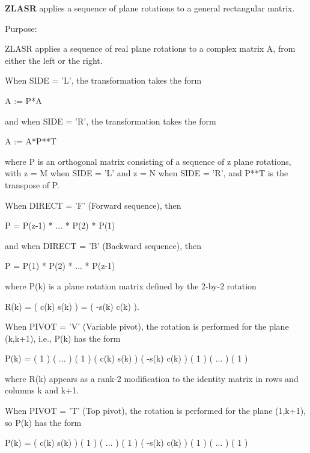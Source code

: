 {\bfseries Z\+L\+A\+S\+R} applies a sequence of plane rotations to a general rectangular matrix. 

 \begin{DoxyParagraph}{Purpose\+: }
\begin{DoxyVerb} ZLASR applies a sequence of real plane rotations to a complex matrix
 A, from either the left or the right.

 When SIDE = 'L', the transformation takes the form

    A := P*A

 and when SIDE = 'R', the transformation takes the form

    A := A*P**T

 where P is an orthogonal matrix consisting of a sequence of z plane
 rotations, with z = M when SIDE = 'L' and z = N when SIDE = 'R',
 and P**T is the transpose of P.
 
 When DIRECT = 'F' (Forward sequence), then
 
    P = P(z-1) * ... * P(2) * P(1)
 
 and when DIRECT = 'B' (Backward sequence), then
 
    P = P(1) * P(2) * ... * P(z-1)
 
 where P(k) is a plane rotation matrix defined by the 2-by-2 rotation
 
    R(k) = (  c(k)  s(k) )
         = ( -s(k)  c(k) ).
 
 When PIVOT = 'V' (Variable pivot), the rotation is performed
 for the plane (k,k+1), i.e., P(k) has the form
 
    P(k) = (  1                                            )
           (       ...                                     )
           (              1                                )
           (                   c(k)  s(k)                  )
           (                  -s(k)  c(k)                  )
           (                                1              )
           (                                     ...       )
           (                                            1  )
 
 where R(k) appears as a rank-2 modification to the identity matrix in
 rows and columns k and k+1.
 
 When PIVOT = 'T' (Top pivot), the rotation is performed for the
 plane (1,k+1), so P(k) has the form
 
    P(k) = (  c(k)                    s(k)                 )
           (         1                                     )
           (              ...                              )
           (                     1                         )
           ( -s(k)                    c(k)                 )
           (                                 1             )
           (                                      ...      )
           (                                             1 )
 

\end{DoxyVerb}
\end{DoxyParagraph}
